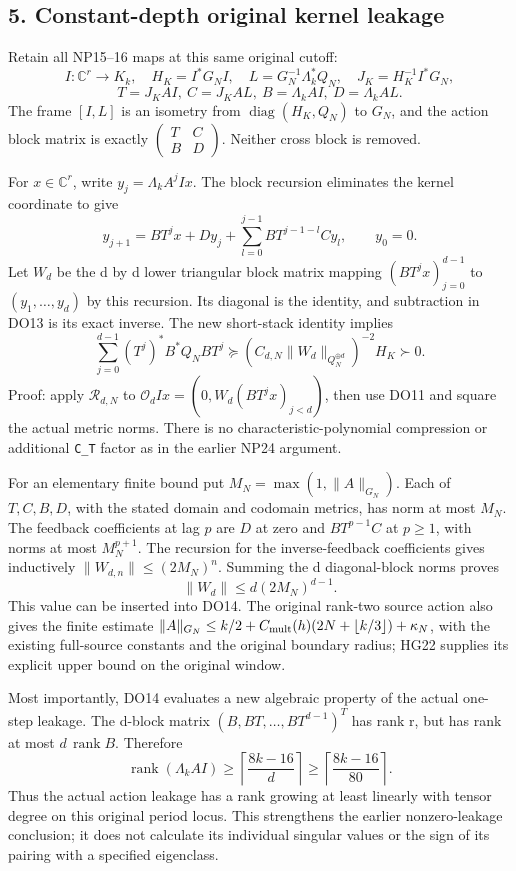 \documentclass[11pt]{article}
\begin{document}
\subsection{5. Constant-depth original kernel leakage}\label{constant-depth-original-kernel-leakage}

Retain all NP15--16 maps at this same original cutoff: \[
I:\mathbb C^r\to K_k,\quad H_K=I^*G_NI,\quad
L=G_N^{-1}\Lambda_k^*Q_N,\quad J_K=H_K^{-1}I^*G_N,
\] \[
T=J_KAI,\ C=J_KAL,\ B=\Lambda_k AI,\ D=\Lambda_k AL.
\tag{DO12}
\] The frame \([I,L]\) is an isometry from \(\operatorname{diag}(H_K,Q_N)\) to \(G_N\), and the action block matrix is exactly \(\left(\begin{smallmatrix}T&C\\B&D\end{smallmatrix}\right)\). Neither cross block is removed.

For \(x\in\mathbb C^r\), write \(y_j=\Lambda_k A^jIx\). The block recursion eliminates the kernel coordinate to give \[
y_{j+1}=BT^jx+Dy_j+
\sum_{l=0}^{j-1}BT^{j-1-l}Cy_l,\qquad y_0=0.
\tag{DO13}
\] Let \(W_d\) be the d by d lower triangular block matrix mapping \((BT^jx)_{j=0}^{d-1}\) to \((y_1,\ldots,y_d)\) by this recursion. Its diagonal is the identity, and subtraction in DO13 is its exact inverse. The new short-stack identity implies \[
\boxed{\displaystyle
\sum_{j=0}^{d-1}(T^j)^*B^*Q_NBT^j
\succeq (C_{d,N}\|W_d\|_{Q_N^{\oplus d}})^{-2}H_K\succ0.}
\tag{DO14}
\] Proof: apply \(\mathcal R_{d,N}\) to \(\mathcal O_dIx=(0,W_d(BT^jx)_{j<d})\), then use DO11 and square the actual metric norms. There is no characteristic-polynomial compression or additional \texttt{C\_T} factor as in the earlier NP24 argument.

For an elementary finite bound put \(M_N=\max(1,\|A\|_{G_N})\). Each of \(T,C,B,D\), with the stated domain and codomain metrics, has norm at most \(M_N\). The feedback coefficients at lag \(p\) are \(D\) at zero and \(BT^{p-1}C\) at \(p\ge1\), with norms at most \(M_N^{p+1}\). The recursion for the inverse-feedback coefficients gives inductively \(\|W_{d,n}\|\le(2M_N)^n\). Summing the d diagonal-block norms proves \[
\|W_d\|\le d(2M_N)^{d-1}.
\tag{DO15}
\] This value can be inserted into DO14. The original rank-two source action also gives the finite estimate \(\|A\|_{G_N}\le k/2+C_{\rm mult}(h)(2N+\lfloor k/3\rfloor)+\kappa_N\), with the existing full-source constants and the original boundary radius; HG22 supplies its explicit upper bound on the original window.

Most importantly, DO14 evaluates a new algebraic property of the actual one-step leakage. The d-block matrix \((B,BT,\ldots,BT^{d-1})^T\) has rank r, but has rank at most \(d\,\operatorname{rank}B\). Therefore \[
\boxed{\displaystyle
\operatorname{rank}(\Lambda_k AI)
\ge\left\lceil\frac{8k-16}{d}\right\rceil
\ge\left\lceil\frac{8k-16}{80}\right\rceil.}
\tag{DO16}
\] Thus the actual action leakage has a rank growing at least linearly with tensor degree on this original period locus. This strengthens the earlier nonzero-leakage conclusion; it does not calculate its individual singular values or the sign of its pairing with a specified eigenclass.
\end{document}
